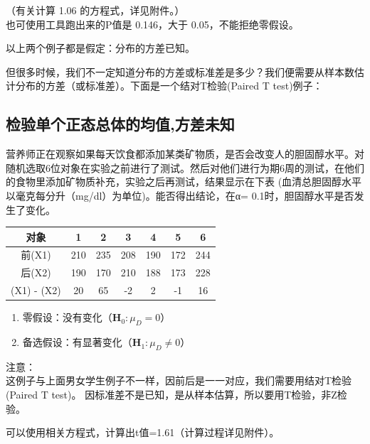 （有关计算 1.06 的方程式，详见附件。）\\
也可使用工具跑出来的P值是 0.146，大于 0.05，不能拒绝零假设。

以上两个例子都是假定：分布的方差已知。

但很多时候，我们不一定知道分布的方差或标准差是多少？我们便需要从样本数估计分布的方差（或标准差）。下面是一个结对T检验(Paired
T test)例子：

\hypertarget{ux68c0ux9a8cux5355ux4e2aux6b63ux6001ux603bux4f53ux7684ux5747ux503cux65b9ux5deeux672aux77e5}{%
\subsection{检验单个正态总体的均值,方差未知}\label{ux68c0ux9a8cux5355ux4e2aux6b63ux6001ux603bux4f53ux7684ux5747ux503cux65b9ux5deeux672aux77e5}}

营养师正在观察如果每天饮食都添加某类矿物质，是否会改变人的胆固醇水平。对随机选取6位对象在实验之前进行了测试。然后对他们进行为期6周的测试，在他们的食物里添加矿物质补充，实验之后再测试，结果显示在下表
(血清总胆固醇水平以毫克每分升（mg/dl）为单位)。能否得出结论，在α=
0.1时，胆固醇水平是否发生了变化。



\begin{tabular}{|c|c|c|c|c|c|c|}
\hline
对象&1&2&3&4&5&6\\
\hline
前(X1)&210&235&208&190&172&244\\
\hline
后(X2)&190&170&210&188&173&228\\
\hline
(X1) - (X2)&20&65&-2&2&-1&16\\
\hline
\end{tabular}

\begin{enumerate}
\tightlist
\item
  零假设：没有变化（\(\mathbf{H}_0: \mu _D = 0\)）
\item
  备选假设：有显著变化（\(\mathbf{H}_1: \mu _D \neq 0\)）
\end{enumerate}

注意：\\
这例子与上面男女学生例子不一样，因前后是一一对应，我们需要用结对T检验
(Paired T test)。
因标准差不是已知，是从样本估算，所以要用T检验，非Z检验。

可以使用相关方程式，计算出t值=1.61（计算过程详见附件）。



